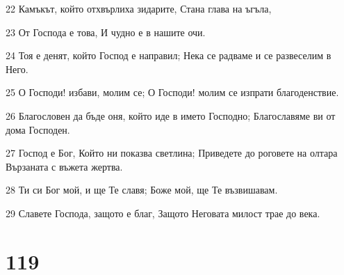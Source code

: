 \par 22 Камъкът, който отхвърлиха зидарите, Стана глава на ъгъла,
\par 23 От Господа е това, И чудно е в нашите очи.
\par 24 Тоя е денят, който Господ е направил; Нека се радваме и се развеселим в Него.
\par 25 О Господи! избави, молим се; О Господи! молим се изпрати благоденствие.
\par 26 Благословен да бъде оня, който иде в името Господно; Благославяме ви от дома Господен.
\par 27 Господ е Бог, Който ни показва светлина; Приведете до роговете на олтара Вързаната с въжета жертва.
\par 28 Ти си Бог мой, и ще Те славя; Боже мой, ще Те възвишавам.
\par 29 Славете Господа, защото е благ, Защото Неговата милост трае до века.

\chapter{119}

